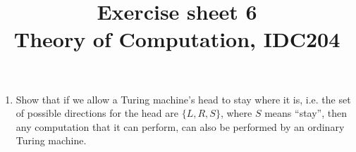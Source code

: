 \documentclass[a4paper]{article}
\title{Exercise sheet 6\\ {\small Theory of Computation, IDC204} }
\date{}
\begin{document}
\maketitle
\begin{enumerate}
\item Show that if we allow a Turing machine’s head to stay where it is, i.e. the set of possible directions for the head are $\{L,R,S\}$, where $S$ means ``stay'', then any computation that it can perform, can also be performed by an ordinary Turing machine.
\end{enumerate}
\end{document}
